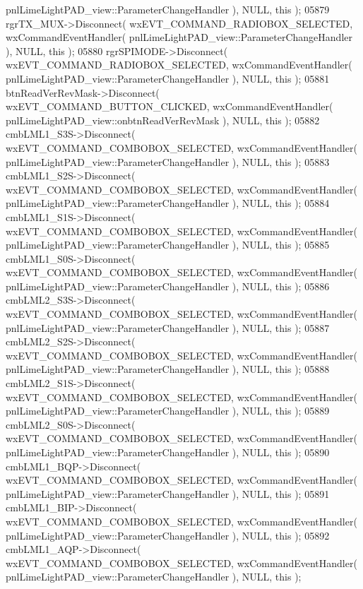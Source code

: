 \begin{DoxyCode}
      pnlLimeLightPAD_view::ParameterChangeHandler ), NULL, \textcolor{keyword}{this} );
05879     rgrTX_MUX->Disconnect( wxEVT\_COMMAND\_RADIOBOX\_SELECTED, wxCommandEventHandler( 
      pnlLimeLightPAD_view::ParameterChangeHandler ), NULL, \textcolor{keyword}{this} );
05880     rgrSPIMODE->Disconnect( wxEVT\_COMMAND\_RADIOBOX\_SELECTED, wxCommandEventHandler( 
      pnlLimeLightPAD_view::ParameterChangeHandler ), NULL, \textcolor{keyword}{this} );
05881     btnReadVerRevMask->Disconnect( wxEVT\_COMMAND\_BUTTON\_CLICKED, wxCommandEventHandler( 
      pnlLimeLightPAD_view::onbtnReadVerRevMask ), NULL, \textcolor{keyword}{this} );
05882     cmbLML1_S3S->Disconnect( wxEVT\_COMMAND\_COMBOBOX\_SELECTED, wxCommandEventHandler( 
      pnlLimeLightPAD_view::ParameterChangeHandler ), NULL, \textcolor{keyword}{this} );
05883     cmbLML1_S2S->Disconnect( wxEVT\_COMMAND\_COMBOBOX\_SELECTED, wxCommandEventHandler( 
      pnlLimeLightPAD_view::ParameterChangeHandler ), NULL, \textcolor{keyword}{this} );
05884     cmbLML1_S1S->Disconnect( wxEVT\_COMMAND\_COMBOBOX\_SELECTED, wxCommandEventHandler( 
      pnlLimeLightPAD_view::ParameterChangeHandler ), NULL, \textcolor{keyword}{this} );
05885     cmbLML1_S0S->Disconnect( wxEVT\_COMMAND\_COMBOBOX\_SELECTED, wxCommandEventHandler( 
      pnlLimeLightPAD_view::ParameterChangeHandler ), NULL, \textcolor{keyword}{this} );
05886     cmbLML2_S3S->Disconnect( wxEVT\_COMMAND\_COMBOBOX\_SELECTED, wxCommandEventHandler( 
      pnlLimeLightPAD_view::ParameterChangeHandler ), NULL, \textcolor{keyword}{this} );
05887     cmbLML2_S2S->Disconnect( wxEVT\_COMMAND\_COMBOBOX\_SELECTED, wxCommandEventHandler( 
      pnlLimeLightPAD_view::ParameterChangeHandler ), NULL, \textcolor{keyword}{this} );
05888     cmbLML2_S1S->Disconnect( wxEVT\_COMMAND\_COMBOBOX\_SELECTED, wxCommandEventHandler( 
      pnlLimeLightPAD_view::ParameterChangeHandler ), NULL, \textcolor{keyword}{this} );
05889     cmbLML2_S0S->Disconnect( wxEVT\_COMMAND\_COMBOBOX\_SELECTED, wxCommandEventHandler( 
      pnlLimeLightPAD_view::ParameterChangeHandler ), NULL, \textcolor{keyword}{this} );
05890     cmbLML1_BQP->Disconnect( wxEVT\_COMMAND\_COMBOBOX\_SELECTED, wxCommandEventHandler( 
      pnlLimeLightPAD_view::ParameterChangeHandler ), NULL, \textcolor{keyword}{this} );
05891     cmbLML1_BIP->Disconnect( wxEVT\_COMMAND\_COMBOBOX\_SELECTED, wxCommandEventHandler( 
      pnlLimeLightPAD_view::ParameterChangeHandler ), NULL, \textcolor{keyword}{this} );
05892     cmbLML1_AQP->Disconnect( wxEVT\_COMMAND\_COMBOBOX\_SELECTED, wxCommandEventHandler( 
      pnlLimeLightPAD_view::ParameterChangeHandler ), NULL, \textcolor{keyword}{this} );

\end{DoxyCode}
